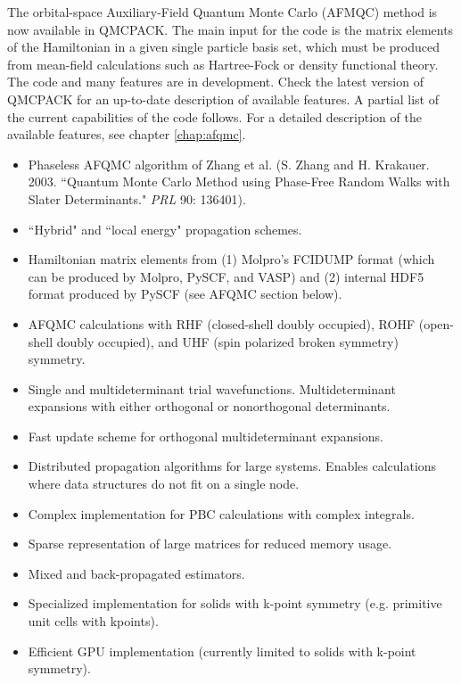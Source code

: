 The orbital-space Auxiliary-Field Quantum Monte Carlo (AFMQC) method is now available in QMCPACK. The main input for the code is the matrix elements of the Hamiltonian in a given single particle basis set, which must be produced from mean-field calculations such as Hartree-Fock or density functional theory. The code and many features are in development. Check the latest version of QMCPACK for an up-to-date description of available features. A partial list of the current capabilities of the code follows. For a detailed description of the available features, see chapter \ref{chap:afqmc}.
 
\begin{itemize}
    \item Phaseless AFQMC algorithm of Zhang et al. (S. Zhang and H. Krakauer. 2003. ``Quantum Monte Carlo Method using Phase-Free Random Walks with Slater Determinants." \textit{PRL} 90: 136401).
    \item ``Hybrid" and ``local energy" propagation schemes.
    \item Hamiltonian matrix elements from (1) Molpro's FCIDUMP format (which can be produced by Molpro, PySCF, and VASP) and (2) internal HDF5 format produced by PySCF (see AFQMC section below).
    \item AFQMC calculations with RHF (closed-shell doubly occupied), ROHF (open-shell doubly occupied), and UHF (spin polarized broken symmetry) symmetry. 
    \item Single and multideterminant trial wavefunctions. Multideterminant expansions with either orthogonal or nonorthogonal determinants. 
    \item Fast update scheme for orthogonal multideterminant expansions.
    \item Distributed propagation algorithms for large systems. Enables calculations where data structures do not fit on a single node.
    \item Complex implementation for PBC calculations with complex integrals.
    \item Sparse representation of large matrices for reduced memory usage.
    \item Mixed and back-propagated estimators.   
    \item Specialized implementation for solids with k-point symmetry (e.g. primitive unit cells with kpoints).
    \item Efficient GPU implementation (currently limited to solids with k-point symmetry).
\end{itemize}

